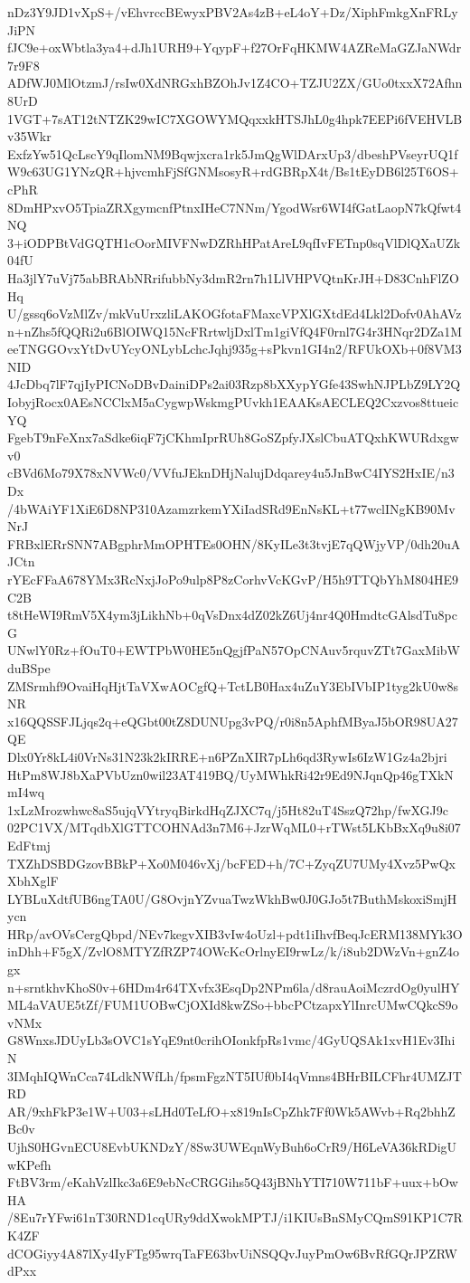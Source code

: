 nDz3Y9JD1vXpS+/vEhvrccBEwyxPBV2As4zB+eL4oY+Dz/XiphFmkgXnFRLyJiPN
fJC9e+oxWbtla3ya4+dJh1URH9+YqypF+f27OrFqHKMW4AZReMaGZJaNWdr7r9F8
ADfWJ0MlOtzmJ/rsIw0XdNRGxhBZOhJv1Z4CO+TZJU2ZX/GUo0txxX72Afhn8UrD
1VGT+7sAT12tNTZK29wIC7XGOWYMQqxxkHTSJhL0g4hpk7EEPi6fVEHVLBv35Wkr
ExfzYw51QcLscY9qIlomNM9Bqwjxcra1rk5JmQgWlDArxUp3/dbeshPVseyrUQ1f
W9c63UG1YNzQR+hjvcmhFjSfGNMsosyR+rdGBRpX4t/Bs1tEyDB6l25T6OS+cPhR
8DmHPxvO5TpiaZRXgymcnfPtnxIHeC7NNm/YgodWsr6WI4fGatLaopN7kQfwt4NQ
3+iODPBtVdGQTH1cOorMIVFNwDZRhHPatAreL9qfIvFETnp0sqVlDlQXaUZk04fU
Ha3jlY7uVj75abBRAbNRrifubbNy3dmR2rn7h1LlVHPVQtnKrJH+D83CnhFlZOHq
U/gssq6oVzMlZv/mkVuUrxzliLAKOGfotaFMaxcVPXlGXtdEd4Lkl2Dofv0AhAVz
n+nZhs5fQQRi2u6BlOIWQ15NcFRrtwljDxlTm1giVfQ4F0rnl7G4r3HNqr2DZa1M
eeTNGGOvxYtDvUYcyONLybLchcJqhj935g+sPkvn1GI4n2/RFUkOXb+0f8VM3NID
4JcDbq7lF7qjIyPICNoDBvDainiDPs2ai03Rzp8bXXypYGfe43SwhNJPLbZ9LY2Q
IobyjRocx0AEsNCClxM5aCygwpWskmgPUvkh1EAAKsAECLEQ2Cxzvos8ttueicYQ
FgebT9nFeXnx7aSdke6iqF7jCKhmIprRUh8GoSZpfyJXslCbuATQxhKWURdxgwv0
cBVd6Mo79X78xNVWc0/VVfuJEknDHjNalujDdqarey4u5JnBwC4IYS2HxIE/n3Dx
/4bWAiYF1XiE6D8NP310AzamzrkemYXiIadSRd9EnNsKL+t77wclINgKB90MvNrJ
FRBxlERrSNN7ABgphrMmOPHTEs0OHN/8KyILe3t3tvjE7qQWjyVP/0dh20uAJCtn
rYEcFFaA678YMx3RcNxjJoPo9ulp8P8zCorhvVcKGvP/H5h9TTQbYhM804HE9C2B
t8tHeWI9RmV5X4ym3jLikhNb+0qVsDnx4dZ02kZ6Uj4nr4Q0HmdtcGAlsdTu8pcG
UNwlY0Rz+fOuT0+EWTPbW0HE5nQgjfPaN57OpCNAuv5rquvZTt7GaxMibWduBSpe
ZMSrmhf9OvaiHqHjtTaVXwAOCgfQ+TctLB0Hax4uZuY3EbIVbIP1tyg2kU0w8sNR
x16QQSSFJLjqs2q+eQGbt00tZ8DUNUpg3vPQ/r0i8n5AphfMByaJ5bOR98UA27QE
Dlx0Yr8kL4i0VrNs31N23k2kIRRE+n6PZnXIR7pLh6qd3RywIs6IzW1Gz4a2bjri
HtPm8WJ8bXaPVbUzn0wil23AT419BQ/UyMWhkRi42r9Ed9NJqnQp46gTXkNmI4wq
1xLzMrozwhwc8aS5ujqVYtryqBirkdHqZJXC7q/j5Ht82uT4SszQ72hp/fwXGJ9c
02PC1VX/MTqdbXlGTTCOHNAd3n7M6+JzrWqML0+rTWst5LKbBxXq9u8i07EdFtmj
TXZhDSBDGzovBBkP+Xo0M046vXj/bcFED+h/7C+ZyqZU7UMy4Xvz5PwQxXbhXglF
LYBLuXdtfUB6ngTA0U/G8OvjnYZvuaTwzWkhBw0J0GJo5t7ButhMskoxiSmjHycn
HRp/avOVsCergQbpd/NEv7kegvXIB3vIw4oUzl+pdt1iIhvfBeqJcERM138MYk3O
inDhh+F5gX/ZvlO8MTYZfRZP74OWcKcOrlnyEI9rwLz/k/i8ub2DWzVn+gnZ4ogx
n+srntkhvKhoS0v+6HDm4r64TXvfx3EsqDp2NPm6la/d8rauAoiMczrdOg0yulHY
ML4aVAUE5tZf/FUM1UOBwCjOXId8kwZSo+bbcPCtzapxYlInrcUMwCQkcS9ovNMx
G8WnxsJDUyLb3sOVC1sYqE9nt0crihOIonkfpRs1vmc/4GyUQSAk1xvH1Ev3IhiN
3IMqhIQWnCca74LdkNWfLh/fpsmFgzNT5IUf0bI4qVmns4BHrBILCFhr4UMZJTRD
AR/9xhFkP3e1W+U03+sLHd0TeLfO+x819nIsCpZhk7Ff0Wk5AWvb+Rq2bhhZBc0v
UjhS0HGvnECU8EvbUKNDzY/8Sw3UWEqnWyBuh6oCrR9/H6LeVA36kRDigUwKPefh
FtBV3rm/eKahVzlIkc3a6E9ebNcCRGGihs5Q43jBNhYTI710W711bF+uux+bOwHA
/8Eu7rYFwi61nT30RND1cqURy9ddXwokMPTJ/i1KIUsBnSMyCQmS91KP1C7RK4ZF
dCOGiyy4A87lXy4IyFTg95wrqTaFE63bvUiNSQQvJuyPmOw6BvRfGQrJPZRWdPxx
